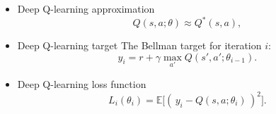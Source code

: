 \documentclass[11pt]{article}
\begin{document}
\begin{itemize}
	      Repeat (for each episode):

	      \quad Initialize $S$

	      \quad Repeat (for each step of episode):

	      \qquad Choose $A$ from $S$ using policy derived from $Q$ (e.g., $\varepsilon$-greedy)

	      \qquad Take action $A$, observe $R$, $S'$

	      \qquad $Q(S,A) \leftarrow Q(S,A) + \alpha\left[ R + \gamma \max_a Q(S',a) - Q(S,A) \right]$

	      \qquad $S \leftarrow S'$

	      \quad until $S$ is terminal.


	      \[
		      Q_{i+1}(s,a)
		      = \mathbb{E}\left[\, r + \gamma \max_{a'} Q_i(s', a') \mid s, a \,\right]
	      \]

	      \[
		      Q_i \;\text{will converge to}\; Q^{*} \;\text{as}\; i \to \infty
	      \]

	\item Deep Q-learning approximation
	      \[
		      Q(s,a;\theta) \approx Q^{*}(s,a),
	      \]
	\item Deep Q-learning target
	      The Bellman target for iteration $i$:
	      \[
		      y_i = r + \gamma \max_{a'} Q(s',a';\theta_{i-1}).
	      \]
	\item Deep Q-learning loss function
	      \[
		      L_i(\theta_i) = \mathbb{E}\Big[(\, y_i - Q(s,a;\theta_i) \,)^2\Big].
	      \]

\end{itemize}
\end{document}
